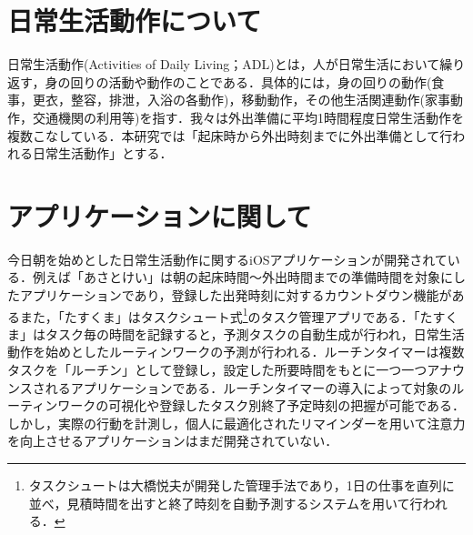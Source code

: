 \section{日常生活動作について}
日常生活動作(Activities of Daily Living；ADL)とは，人が日常生活において繰り返す，身の回りの活動や動作のことである．具体的には，身の回りの動作(食事，更衣，整容，排泄，入浴の各動作)，移動動作，その他生活関連動作(家事動作，交通機関の利用等)を指す\cite{酒井2003}．我々は外出準備に平均1時間程度日常生活動作を複数こなしている\cite{duhouse}．本研究では「起床時から外出時刻までに外出準備として行われる日常生活動作」とする．

\section{アプリケーションに関して}
今日朝を始めとした日常生活動作に関するiOSアプリケーションが開発されている．例えば「あさとけい」は朝の起床時間〜外出時間までの準備時間を対象にしたアプリケーションであり，登録した出発時刻に対するカウントダウン機能がある\cite{あさとけい}また，「たすくま」はタスクシュート式\footnote{タスクシュートは大橋悦夫が開発した管理手法であり，1日の仕事を直列に並べ，見積時間を出すと終了時刻を自動予測するシステムを用いて行われる．}のタスク管理アプリである\cite{たすくま}．「たすくま」はタスク毎の時間を記録すると，予測タスクの自動生成が行われ，日常生活動作を始めとしたルーティンワークの予測が行われる．ルーチンタイマーは複数タスクを「ルーチン」として登録し，設定した所要時間をもとに一つ一つアナウンスされるアプリケーションである\cite{ルーチンタイマー}．ルーチンタイマーの導入によって対象のルーティンワークの可視化や登録したタスク別終了予定時刻の把握が可能である．しかし，実際の行動を計測し，個人に最適化されたリマインダーを用いて注意力を向上させるアプリケーションはまだ開発されていない．

